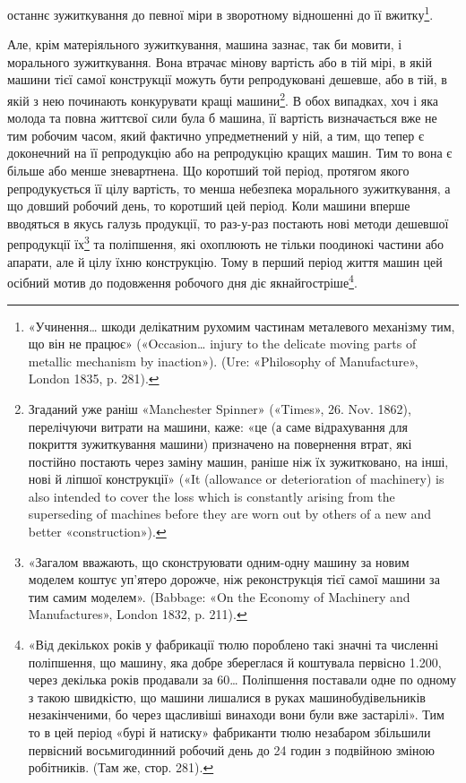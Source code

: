 \parcont{}  %
останнє зужиткування до певної міри в зворотному відношенні
до її вжитку\footnote{
«Учинення\dots{} шкоди делікатним рухомим частинам металевого
механізму тим, що він не працює» («Occasion\dots{} injury to the delicate
moving parts of metallic mechanism by inaction»). (Ure: «Philosophy
of Manufacture», London 1835, p. 281).
}.

Але, крім матеріяльного зужиткування, машина зазнає, так би
мовити, і морального зужиткування. Вона втрачає мінову вартість
або в тій мірі, в якій машини тієї самої конструкції можуть бути
репродуковані дешевше, або в тій, в якій з нею починають конкурувати
кращі машини\footnote{
Згаданий уже раніш «Manchester Spinner» («Times», 26. Nov. 1862),
перелічуючи витрати на машини, каже: «це (а саме відрахування для покриття
зужиткування машини) призначено на повернення втрат, які постійно
постають через заміну машин, раніше ніж їх зужитковано, на інші,
нові й ліпшої конструкції» («It (allowance or deterioration of machinery)
is also intended to cover the loss which is constantly arising from the superseding
of machines before they are worn out by others of a new and better
«construction»).
}. В обох випадках, хоч і яка молода
та повна життєвої сили була б машина, її вартість визначається вже
не тим робочим часом, який фактично упредметнений у ній, а тим,
що тепер є доконечний на її репродукцію або на репродукцію
кращих машин. Тим то вона є більше або менше зневартнена.
Що коротший той період, протягом якого репродукується її цілу
вартість, то менша небезпека морального зужиткування, а що
довший робочий день, то коротший цей період. Коли машини вперше
вводяться в якусь галузь продукції, то раз-у-раз постають
нові методи дешевшої репродукції їх\footnote{
«Загалом вважають, що сконструювати одним-одну машину за
новим моделем коштує уп’ятеро дорожче, ніж реконструкція тієї самої
машини за тим самим моделем». (Babbage: «On the Economy of Machinery
and Manufactures», London 1832, p. 211).
} та поліпшення, які охоплюють
не тільки поодинокі частини або апарати, але й цілу їхню
конструкцію. Тому в перший період життя машин цей осібний
мотив до подовження робочого дня діє якнайгостріше\footnote{«Від декількох років у фабрикації тюлю пороблено такі значні та
численні поліпшення, що машину, яка добре збереглася й коштувала
первісно \num{1.200}, через декілька років продавали за
60\dots{} Поліпшення поставали одне по одному з такою
швидкістю, що машини лишалися в руках машинобудівельників незакінченими,
бо через щасливіші винаходи вони були вже застарілі». Тим то
в цей період «бурі й натиску» фабриканти тюлю незабаром збільшили первісний
восьмигодинний робочий день до 24 годин з подвійною зміною
робітників. (Там же, стор. 281).}.

